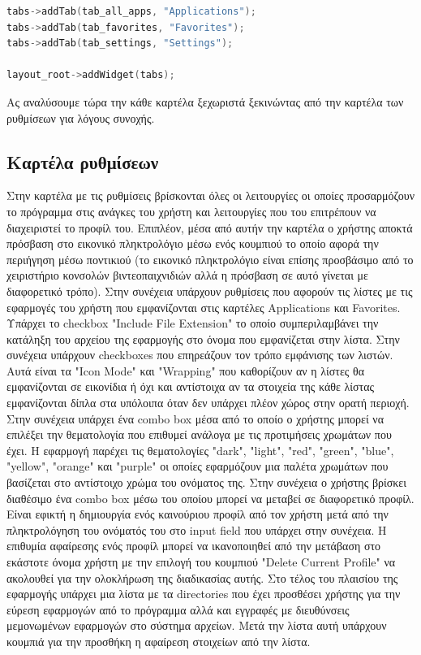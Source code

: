 \begin{lstlisting}[language=C++, style=cppstyle]
tabs->addTab(tab_all_apps, "Applications");
tabs->addTab(tab_favorites, "Favorites");
tabs->addTab(tab_settings, "Settings");

layout_root->addWidget(tabs);
\end{lstlisting}

Ας αναλύσουμε τώρα την κάθε καρτέλα ξεχωριστά ξεκινώντας από την καρτέλα των ρυθμίσεων για
λόγους συνοχής.



\subsection{Καρτέλα ρυθμίσεων}

Στην καρτέλα με τις ρυθμίσεις βρίσκονται όλες οι λειτουργίες οι οποίες προσαρμόζουν το
πρόγραμμα στις ανάγκες του χρήστη και λειτουργίες που του επιτρέπουν να διαχειριστεί το
προφίλ του. Επιπλέον, μέσα από αυτήν την καρτέλα ο χρήστης αποκτά πρόσβαση στο εικονικό
πληκτρολόγιο μέσω ενός κουμπιού το οποίο αφορά την περιήγηση μέσω ποντικιού (το εικονικό
πληκτρολόγιο είναι επίσης προσβάσιμο από το χειριστήριο κονσολών βιντεοπαιχνιδιών αλλά η
πρόσβαση σε αυτό γίνεται με διαφορετικό τρόπο). Στην συνέχεια υπάρχουν ρυθμίσεις που αφορούν
τις λίστες με τις εφαρμογές του χρήστη που εμφανίζονται στις καρτέλες Applications και 
Favorites. Υπάρχει το checkbox "Include File Extension" το οποίο συμπεριλαμβάνει την κατάληξη
του αρχείου της εφαρμογής στο όνομα που εμφανίζεται στην λίστα. Στην συνέχεια υπάρχουν
checkboxes που επηρεάζουν τον τρόπο εμφάνισης των λιστών. Αυτά είναι τα "Icon Mode" και
"Wrapping" που καθορίζουν αν η λίστες θα εμφανίζονται σε εικονίδια ή όχι και αντίστοιχα αν τα στοιχεία
της κάθε λίστας εμφανίζονται δίπλα στα υπόλοιπα όταν δεν υπάρχει πλέον χώρος στην ορατή περιοχή.
Στην συνέχεια υπάρχει ένα combo box μέσα από το οποίο ο χρήστης μπορεί να επιλέξει την
θεματολογία που επιθυμεί ανάλογα με τις προτιμήσεις χρωμάτων που έχει. Η εφαρμογή παρέχει τις
θεματολογίες "dark", "light", "red", "green", "blue", "yellow", "orange" και "purple" οι οποίες
εφαρμόζουν μια παλέτα χρωμάτων που βασίζεται στο αντίστοιχο χρώμα του ονόματος της. Στην συνέχεια
ο χρήστης βρίσκει διαθέσιμο ένα combo box μέσω του οποίου μπορεί να μεταβεί σε διαφορετικό προφίλ.
Είναι εφικτή η δημιουργία ενός καινούριου προφίλ από τον χρήστη μετά από την πληκτρολόγηση του
ονόματός του στο input field που υπάρχει στην συνέχεια. Η επιθυμία αφαίρεσης ενός προφίλ μπορεί να
ικανοποιηθεί από την μετάβαση στο εκάστοτε όνομα χρήστη με την επιλογή του κουμπιού
"Delete Current Profile" να ακολουθεί για την ολοκλήρωση της διαδικασίας αυτής. Στο τέλος του πλαισίου
της εφαρμογής υπάρχει μια λίστα με τα directories που έχει προσθέσει χρήστης για την εύρεση εφαρμογών 
από το πρόγραμμα αλλά και εγγραφές με διευθύνσεις μεμονωμένων εφαρμογών στο σύστημα αρχείων.
Μετά την λίστα αυτή υπάρχουν κουμπιά για την προσθήκη η αφαίρεση στοιχείων από την λίστα.

